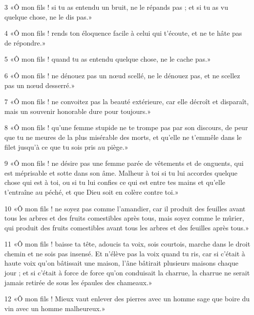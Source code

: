 \par 3 «Ô mon fils ! si tu as entendu un bruit, ne le répands pas ; et si tu as vu quelque chose, ne le dis pas.»

\par 4 «Ô mon fils ! rends ton éloquence facile à celui qui t'écoute, et ne te hâte pas de répondre.»

\par 5 «Ô mon fils ! quand tu as entendu quelque chose, ne le cache pas.»

\par 6 «Ô mon fils ! ne dénouez pas un nœud scellé, ne le dénouez pas, et ne scellez pas un nœud desserré.»

\par 7 «Ô mon fils ! ne convoitez pas la beauté extérieure, car elle décroît et disparaît, mais un souvenir honorable dure pour toujours.»

\par 8 «Ô mon fils ! qu'une femme stupide ne te trompe pas par son discours, de peur que tu ne meures de la plus misérable des morts, et qu'elle ne t'emmêle dans le filet jusqu'à ce que tu sois pris au piège.»

\par 9 «Ô mon fils ! ne désire pas une femme parée de vêtements et de onguents, qui est méprisable et sotte dans son âme. Malheur à toi si tu lui accordes quelque chose qui est à toi, ou si tu lui confies ce qui est entre tes mains et qu'elle t'entraîne au péché, et que Dieu soit en colère contre toi.»

\par 10 «Ô mon fils ! ne soyez pas comme l'amandier, car il produit des feuilles avant tous les arbres et des fruits comestibles après tous, mais soyez comme le mûrier, qui produit des fruits comestibles avant tous les arbres et des feuilles après tous.»

\par 11 «Ô mon fils ! baisse ta tête, adoucis ta voix, sois courtois, marche dans le droit chemin et ne sois pas insensé. Et n'élève pas la voix quand tu ris, car si c'était à haute voix qu'on bâtissait une maison, l'âne bâtirait plusieurs maisons chaque jour ; et si c'était à force de force qu'on conduisait la charrue, la charrue ne serait jamais retirée de sous les épaules des chameaux.»

\par 12 «Ô mon fils ! Mieux vaut enlever des pierres avec un homme sage que boire du vin avec un homme malheureux.»


